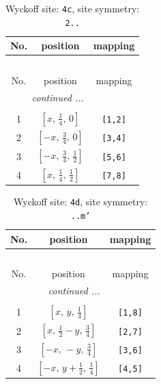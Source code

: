\documentclass[fleqn,8pt]{jsarticle}
\begin{document}
\renewcommand{\arraystretch}{1.2}
\begin{longtable}{ccc}
\caption{Wyckoff site: {\tt 4c}, site symmetry: {\tt 2..}}
 \\
 \hline \hline
No. & position & mapping \\ \hline \endfirsthead

\multicolumn{2}{l}{\tablename\ \thetable{}} \\
 \hline \hline
No. & position & mapping \\ \hline \endhead

 \hline \hline
\multicolumn{2}{r}{\footnotesize\it continued ...} \\ \endfoot

 \hline \hline
\multicolumn{2}{r}{} \\ \endlastfoot

1 & $\left[ x,\, \frac{1}{4},\, 0 \right]$ & {\tt [1,2]} \\ \hline
2 & $\left[ - x,\, \frac{3}{4},\, 0 \right]$ & {\tt [3,4]} \\ \hline
3 & $\left[ - x,\, \frac{3}{4},\, \frac{1}{2} \right]$ & {\tt [5,6]} \\ \hline
4 & $\left[ x,\, \frac{1}{4},\, \frac{1}{2} \right]$ & {\tt [7,8]} \\
\end{longtable}
\renewcommand{\arraystretch}{1.2}
\begin{longtable}{ccc}
\caption{Wyckoff site: {\tt 4d}, site symmetry: {\tt ..m'}}
 \\
 \hline \hline
No. & position & mapping \\ \hline \endfirsthead

\multicolumn{2}{l}{\tablename\ \thetable{}} \\
 \hline \hline
No. & position & mapping \\ \hline \endhead

 \hline \hline
\multicolumn{2}{r}{\footnotesize\it continued ...} \\ \endfoot

 \hline \hline
\multicolumn{2}{r}{} \\ \endlastfoot

1 & $\left[ x,\, y,\, \frac{1}{4} \right]$ & {\tt [1,8]} \\ \hline
2 & $\left[ x,\, \frac{1}{2} - y,\, \frac{3}{4} \right]$ & {\tt [2,7]} \\ \hline
3 & $\left[ - x,\, - y,\, \frac{3}{4} \right]$ & {\tt [3,6]} \\ \hline
4 & $\left[ - x,\, y + \frac{1}{2},\, \frac{1}{4} \right]$ & {\tt [4,5]} \\
\end{longtable}
\end{document}
